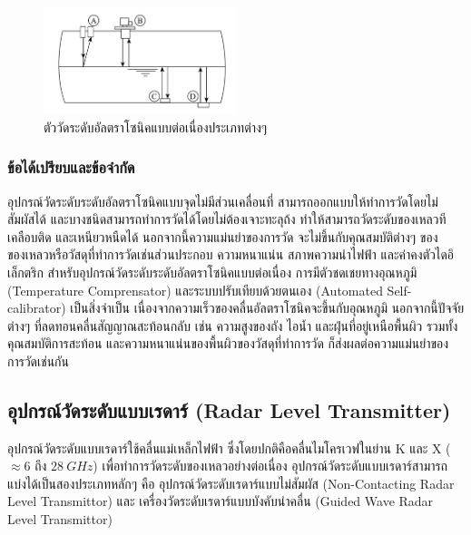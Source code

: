 \documentclass[final,11pt,a4paper]{article}
\begin{document}
\begin{figure}[H]
    \centering
    \includegraphics[width=0.5\textwidth]{images/Screenshot_26.jpg}
    \caption{ตัววัดระดับอัลตราโซนิคแบบต่อเนื่องประเภทต่างๆ}
    \label{fig:ulc}
\end{figure}

\subsubsection{ข้อได้เปรียบและข้อจำกัด}
อุปกรณ์วัดระดับระดับอัลตราโซนิคแบบจุดไม่มีส่วนเคลื่อนที่ สามารถออกแบบให้ทำการวัดโดยไม่สัมผัสได้ และบางชนิดสามารถทำการวัดได้โดยไม่ต้องเจาะทะลุถ้ง 
ทำให้สามารถวัดระดับของเหลวทีเคลือบติด และเหนียวหนืดได้ นอกจากนี้ความแม่นยำของการวัด จะไม่ขึ้นกับคุณสมบัติต่างๆ 
ของของเหลวหรือวัสดุที่ทำการวัดเช่นส่วนประกอบ ความหนาแน่น สภาพความนำไฟฟ้า และค่าคงตัวไดอิเล็กตริก
สำหรับอุปกรณ์วัดระดับระดับอัลตราโซนิคแบบต่อเนื่อง การมีตัวชดเชยทางอุณหภูมิ (Temperature Comprensator) และระบบปรับเทียบด้วยตนเอง 
(Automated Self-calibrator) เป็นสิ่งจำเป็น เนื่องจากความเร็วของคลื่นอัลตราโซนิคจะขึ้นกับอุณหภูมิ นอกจากนี้ปัจจัยต่างๆ ที่ลดทอนคลื่นสัญญาณสะท้อนกลับ
เช่น ความสูงของถัง ไอน้ำ และฝุ่นที่อยู่เหนือพื้นผิว รวมทั้งคุณสมบัติการสะท้อน และความหนาแน่นของพื้นผิวของวัสดุที่ทำการวัด ก็ส่งผลต่อความแม่นยำของการวัดเช่นกัน

\subsection{อุปกรณ์วัดระดับแบบเรดาร์ (Radar Level Transmitter)}
อุปกรณ์วัดระดับแบบเรดาร์ใช้คลื่นแม่เหล็กไฟฟ้า ซึ่งโดยปกติคือคลื่นไมโครเวฟในย่าน K และ X ($\approx 6$ ถึง $\SI{28}{GHz}$) 
เพื่อทำการวัดระดับของเหลวอย่างต่อเนื่อง อุปกรณ์วัดระดับแบบเรดาร์สามารถแบ่งได้เป็นสองประเภทหลักๆ คือ อุปกรณ์วัดระดับเรดาร์แบบไม่สัมผัส
(Non-Contacting Radar Level Transmittor) และ เครื่องวัดระดับเรดาร์แบบบังคับนำคลื่น (Guided Wave Radar Level Transmittor) 
\end{document}
